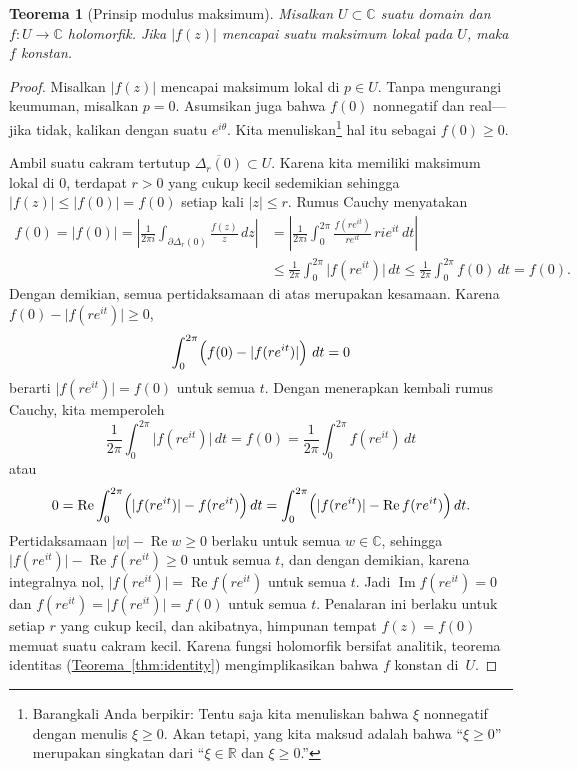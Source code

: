 \documentclass[12pt,openany]{book}
\renewcommand{\Re}{\operatorname{Re}}
\renewcommand{\Im}{\operatorname{Im}}
\newcommand{\sabs}[1]{\lvert {#1} \rvert}
\newcommand{\abs}[1]{\left\lvert {#1} \right\rvert}
\newcommand{\C}{{\mathbb{C}}}
\newcommand{\R}{{\mathbb{R}}}
\newcommand{\myquote}[1]{``#1''}
\theoremstyle{plain}
\newtheorem{thm}{Teorema}[section]
\theoremstyle{remark}
\theoremstyle{definition}
\theoremstyle{exercise}
\theoremstyle{example}
\newcommand{\thmref}[1]{\hyperref[#1]{Teorema~\ref*{#1}}}
\begin{document}
\begin{thm}[Prinsip modulus maksimum]
%
%
Misalkan $U \subset \C$ suatu domain dan
$f \colon U \to \C$ holomorfik.
Jika $\sabs{f(z)}$ mencapai suatu maksimum lokal pada $U$, maka $f$ konstan.
\end{thm}

\begin{proof}
Misalkan $\sabs{f(z)}$ mencapai maksimum lokal di $p \in U$.
Tanpa mengurangi keumuman, misalkan $p = 0$.
Asumsikan juga bahwa $f(0)$ nonnegatif dan real---jika tidak, kalikan dengan 
suatu $e^{i\theta}$.
Kita menuliskan\footnote{%
Barangkali Anda berpikir: Tentu saja kita menuliskan bahwa $\xi$
nonnegatif dengan menulis $\xi \geq 0$.
Akan tetapi, yang kita maksud adalah bahwa \myquote{$\xi \geq 0$}
merupakan singkatan dari \myquote{$\xi \in \R$ dan $\xi \geq 0$.}}
hal itu sebagai $f(0) \geq 0$.

Ambil suatu cakram tertutup $\overline{\Delta_r(0)} \subset U$.
Karena kita memiliki maksimum lokal di $0$,
terdapat $r > 0$ yang cukup kecil
sedemikian sehingga
$\sabs{f(z)} \leq \sabs{f(0)} = f(0)$ setiap kali $\sabs{z} \leq r$.
Rumus Cauchy menyatakan
\begin{equation*}
\begin{split}
f(0) = \sabs{f(0)} =
\abs{\frac{1}{2\pi i}
\int_{\partial \Delta_r(0)}
\frac{f(z)}{z} \, dz
}
& =
\abs{
\frac{1}{2\pi i}
\int_0^{2\pi}
\frac{f(re^{it})}{re^{it}} \, ri e^{it} \, dt
}
\\
& \leq
\frac{1}{2\pi}
\int_0^{2\pi}
\sabs{f(re^{it})}\, dt
\leq
\frac{1}{2\pi}
\int_0^{2\pi}
f(0)\, dt = f(0) .
\end{split}
\end{equation*}
Dengan demikian, semua pertidaksamaan di atas merupakan kesamaan.
Karena $f(0)-\sabs{f(re^{it})} \geq 0$,
\begin{equation*}
\int_0^{2\pi}\Bigl( f(0)-\sabs{f(re^{it})} \Bigr) \ dt = 0
\end{equation*}
berarti $\sabs{f(re^{it})} = f(0)$ untuk semua $t$.
Dengan menerapkan kembali rumus Cauchy,
kita memperoleh
\begin{equation*}
\frac{1}{2\pi}
\int_0^{2\pi}
\sabs{f(re^{it})}\, dt
=
f(0)
=
\frac{1}{2\pi}
\int_0^{2\pi}
f(re^{it})\, dt
\end{equation*}
atau
\begin{equation*}
0 =
\Re \int_0^{2\pi}
\Bigl(\sabs{f(re^{it})}-f(re^{it})\Bigr)\, dt
=
\int_0^{2\pi}
\Bigl(\sabs{f(re^{it})}-\Re f(re^{it})\Bigr)\, dt .
\end{equation*}
Pertidaksamaan $\sabs{w} - \Re w \geq 0$ berlaku untuk semua $w \in \C$,
sehingga
$\sabs{f(re^{it})}-\Re f(re^{it}) \geq 0$ untuk semua $t$, dan dengan demikian,
karena integralnya nol,
$\sabs{f(re^{it})}=\Re f(re^{it})$ untuk semua $t$.
Jadi $\Im f(re^{it}) = 0$
dan 
$f(re^{it})=\sabs{f(re^{it})} = f(0)$ untuk semua $t$.
Penalaran ini berlaku untuk setiap $r$ yang cukup kecil, dan akibatnya, himpunan tempat
$f(z) = f(0)$ memuat suatu cakram kecil.  Karena fungsi holomorfik bersifat analitik,
teorema identitas (\thmref{thm:identity}) mengimplikasikan bahwa $f$ konstan
di~$U$.
\end{proof}
\end{document}
